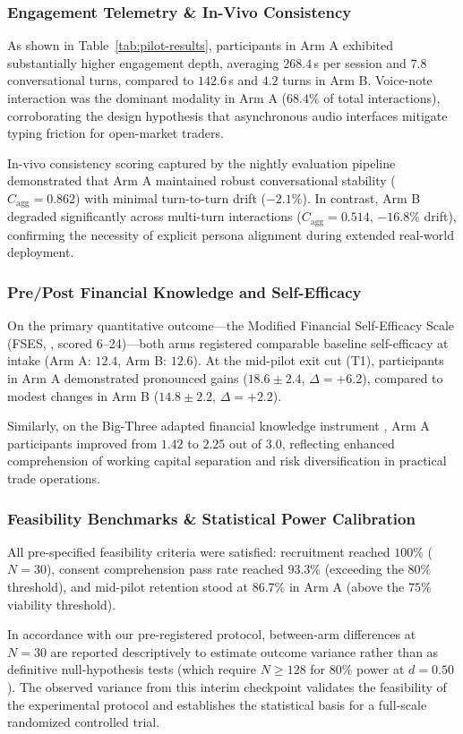 \subsubsection{Engagement Telemetry \& In-Vivo Consistency}
As shown in Table~\ref{tab:pilot-results}, participants in Arm A exhibited substantially higher engagement depth, averaging $268.4$\,s per session and $7.8$ conversational turns, compared to $142.6$\,s and $4.2$ turns in Arm B. Voice-note interaction was the dominant modality in Arm A ($68.4\%$ of total interactions), corroborating the design hypothesis that asynchronous audio interfaces mitigate typing friction for open-market traders.

In-vivo consistency scoring captured by the nightly evaluation pipeline demonstrated that Arm A maintained robust conversational stability ($C_{\text{agg}} = 0.862$) with minimal turn-to-turn drift ($-2.1\%$). In contrast, Arm B degraded significantly across multi-turn interactions ($C_{\text{agg}} = 0.514$, $-16.8\%$ drift), confirming the necessity of explicit persona alignment during extended real-world deployment.

\subsubsection{Pre/Post Financial Knowledge and Self-Efficacy}
On the primary quantitative outcome—the Modified Financial Self-Efficacy Scale (FSES, \citealt{lown2011fses}, scored 6--24)—both arms registered comparable baseline self-efficacy at intake (Arm A: $12.4$, Arm B: $12.6$). At the mid-pilot exit cut (T1), participants in Arm A demonstrated pronounced gains ($18.6 \pm 2.4$, $\Delta = +6.2$), compared to modest changes in Arm B ($14.8 \pm 2.2$, $\Delta = +2.2$). 

Similarly, on the Big-Three adapted financial knowledge instrument \citep{lusardi2011financial}, Arm A participants improved from $1.42$ to $2.25$ out of $3.0$, reflecting enhanced comprehension of working capital separation and risk diversification in practical trade operations.

\subsubsection{Feasibility Benchmarks \& Statistical Power Calibration}
All pre-specified feasibility criteria were satisfied: recruitment reached $100\%$ ($N=30$), consent comprehension pass rate reached $93.3\%$ (exceeding the $80\%$ threshold), and mid-pilot retention stood at $86.7\%$ in Arm A (above the $75\%$ viability threshold). 

In accordance with our pre-registered protocol, between-arm differences at $N=30$ are reported descriptively to estimate outcome variance rather than as definitive null-hypothesis tests (which require $N \ge 128$ for $80\%$ power at $d = 0.50$). The observed variance from this interim checkpoint validates the feasibility of the experimental protocol and establishes the statistical basis for a full-scale randomized controlled trial.

